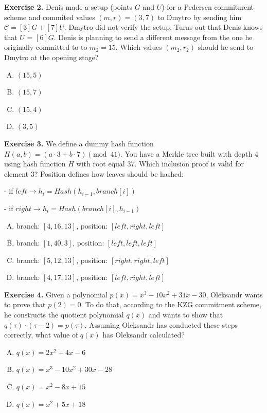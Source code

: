 \documentclass[../lecture-notes.tex]{subfiles}
\begin{document}
\textbf{Exercise 2.} Denis made a setup (points $G$ and $U$) for a Pedersen commitment scheme and commited values $(m, r) = (3, 7)$ to Dmytro
by sending him $\mathcal{C} = [3]G + [7]U$. Dmytro did not verify the setup. Turns out that Denis knows that $U$ = $[6]G$. 
Denis is planning to send a different message from the one he originally committed to
to $m_2 = 15$. Which values $(m_2, r_2)$ should he send to Dmytro at the opening stage?
\begin{enumerate}[(A)]
    \item $(15, 5)$
    \item $(15, 7)$
    \item $(15, 4)$
    \item $(3, 5)$
\end{enumerate}

\newpage

\textbf{Exercise 3.} We define a dummy hash function $H(a, b) = (a \cdot 3 + b \cdot 7) \pmod{41}$. You have a Merkle tree built with depth $4$ 
using hash function $H$ with root equal $37$. Which inclusion proof is valid for element $3$?
Position defines how leaves should be hashed:

    - if $left \rightarrow h_i = Hash(h_{i-1}, branch[i])$

    - if $right \rightarrow  h_i = Hash(branch[i], h_{i-1})$

\begin{enumerate}[(A)]
    \item branch: $[4, 16, 13]$, position: $[left, right, left]$
    \item branch: $[1, 40, 3]$, position: $[left, left, left]$
    \item branch: $[5, 12, 13]$, position: $[right, right, left]$
    \item branch: $[4, 17, 13]$, position: $[left, right, left]$
\end{enumerate}

\textbf{Exercise 4.} Given a polynomial $p(x) = x^3 - 10x^2 + 31x - 30$, Oleksandr wants to prove that $p(2)=0$. 
To do that, according to the KZG commitment scheme, he constructs the quotient polynomial $q(x)$ and wants 
to show that $q(\tau) \cdot (\tau - 2) = p(\tau)$. Assuming Oleksandr has conducted these steps correctly, 
what value of $q(x)$ has Oleksandr calculated?

\begin{enumerate}[(A)]
    \item $q(x) = 2x^2 + 4x - 6$
    \item $q(x) = x^3 - 10x^2 + 30x - 28$
    \item $q(x) = x^2 - 8x + 15$
    \item $q(x) = x^2 + 5x + 18$
\end{enumerate}
\end{document}
